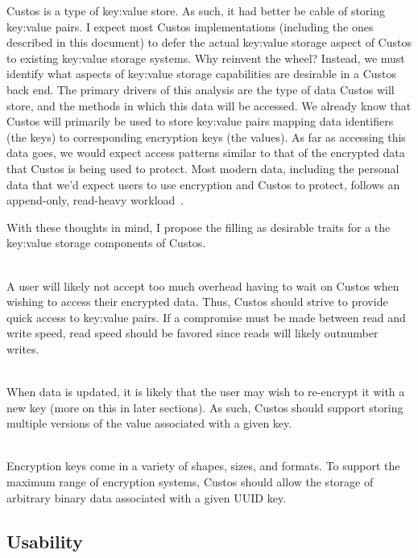 Custos is a type of key:value store. As such, it had better be cable
of storing key:value pairs. I expect most Custos implementations
(including the ones described in this document) to defer the actual
key:value storage aspect of Custos to existing key:value storage
systems. Why reinvent the wheel? Instead, we must identify what
aspects of key:value storage capabilities are desirable in a Custos
back end. The primary drivers of this analysis are the type of data
Custos will store, and the methods in which this data will be
accessed. We already know that Custos will primarily be used to store
key:value pairs mapping data identifiers (the keys) to corresponding
encryption keys (the values). As far as accessing this data goes, we
would expect access patterns similar to that of the encrypted data
that Custos is being used to protect. Most modern data, including the
personal data that we'd expect users to use encryption and Custos to
protect, follows an append-only, read-heavy
workload~\cite{Ghemawat2003}.

With these thoughts in mind, I propose the filling as desirable traits
for a the key:value storage components of Custos.

\begin{packed_desc}
\item[Fast Access] \hfill \\ A user will likely not accept too much
  overhead having to wait on Custos when wishing to access their
  encrypted data. Thus, Custos should strive to provide quick access
  to key:value pairs. If a compromise must be made between read and
  write speed, read speed should be favored since reads will likely
  outnumber writes.
\item[Versioned Data] \hfill \\ When data is updated, it is likely
  that the user may wish to re-encrypt it with a new key (more on this
  in later sections). As such, Custos should support storing multiple
  versions of the value associated with a given key.
\item[Arbitrary Data] \hfill \\ Encryption keys come in a variety of
  shapes, sizes, and formats. To support the maximum range of
  encryption systems, Custos should allow the storage of arbitrary
  binary data associated with a given UUID key.
\end{packed_desc}

\subsection{Usability}


